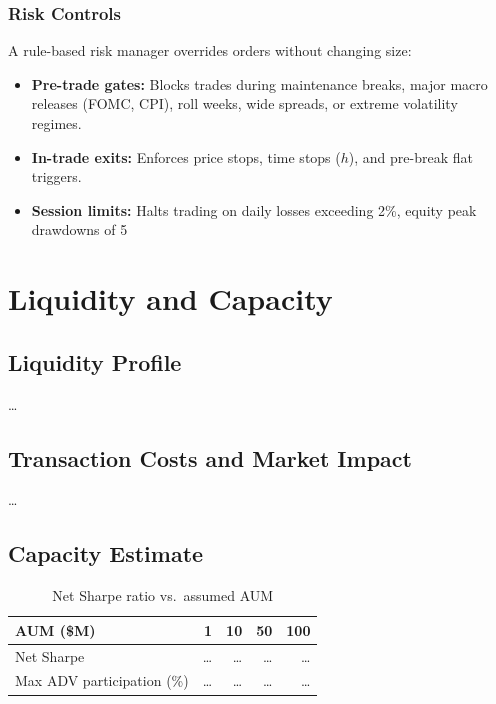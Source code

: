 \documentclass[11pt,letterpaper]{article}
\begin{document}
\subsubsection{Risk Controls}
A rule-based risk manager overrides orders without changing size:
\begin{itemize}
\item \textbf{Pre-trade gates:} Blocks trades during maintenance breaks, major macro releases (FOMC, CPI), roll weeks, wide spreads, or extreme volatility regimes.
\item \textbf{In-trade exits:} Enforces price stops, time stops ($h$), and pre-break flat triggers.
\item \textbf{Session limits:} Halts trading on daily losses exceeding 2\%, equity peak drawdowns of 5%
\end{itemize}
 
\section{Liquidity and Capacity}
\subsection{Liquidity Profile}
\dots
 
\subsection{Transaction Costs and Market Impact}
\dots
 
\subsection{Capacity Estimate}
\begin{table}[H]
\centering
\caption{Net Sharpe ratio vs.\ assumed AUM}
\begin{tabular}{lrrrr}
\toprule
AUM (\$M) & 1 & 10 & 50 & 100 \\
\midrule
Net Sharpe & \dots & \dots & \dots & \dots \\
Max ADV participation (\%) & \dots & \dots & \dots & \dots \\
\bottomrule
\end{tabular}
\end{table}
 
\end{document}
